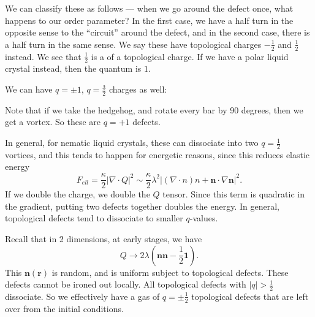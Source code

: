 \documentclass[a4paper]{article}
\begin{document}
We can classify these as follows --- when we go around the defect once, what happens to our order parameter? In the first case, we have a half turn in the opposite sense to the ``circuit'' around the defect, and in the second case, there is a half turn in the same sense. We say these have topological charges $-\frac{1}{2}$ and $\frac{1}{2}$ instead. We see that $\frac{1}{2}$ is a  of a topological charge. If we have a polar liquid crystal instead, then the quantum is $1$.

We can have $q = \pm 1$, $q = \frac{3}{2}$ charges as well:

\begin{center}
\end{center}

Note that if we take the hedgehog, and rotate every bar by 90 degrees, then we get a vortex. So these are $q = +1$ defects.

In general, for nematic liquid crystals, these can dissociate into two $q = \frac{1}{2}$ vortices, and this tends to happen for energetic reasons, since this reduces elastic energy
\[
  F_{ell} = \frac{\kappa}{2} |\nabla \cdot Q|^2 \sim \frac{\kappa}{2} \lambda^2 |(\nabla \cdot n)n + \mathbf{n} \cdot \nabla \mathbf{n}|^2.
\]
If we double the charge, we double the $Q$ tensor. Since this term is quadratic in the gradient, putting two defects together doubles the energy. In general, topological defects tend to dissociate to smaller $q$-values.

Recall that in 2 dimensions, at early stages, we have
\[
  Q \to 2\lambda (\mathbf{n} \mathbf{n} - \frac{1}{2}\mathbf{1}).
\]
This $\mathbf{n}(\mathbf{r})$ is random, and is uniform subject to topological defects. These defects cannot be ironed out locally. All topological defects with $|q| > \frac{1}{2}$ dissociate. So we effectively have a gas of $q = \pm \frac{1}{2}$ topological defects that are left over from the initial conditions.
\end{document}
